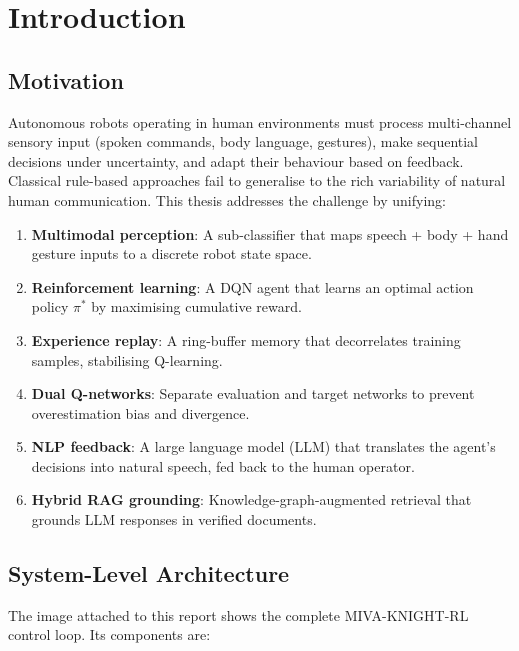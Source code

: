 \documentclass[12pt,a4paper]{article}
\theoremstyle{definition}
\theoremstyle{plain}
\theoremstyle{remark}
\begin{document}
\section{Introduction}

\subsection{Motivation}

Autonomous robots operating in human environments must process multi-channel sensory input (spoken commands, body language, gestures), make sequential decisions under uncertainty, and adapt their behaviour based on feedback. Classical rule-based approaches fail to generalise to the rich variability of natural human communication. This thesis addresses the challenge by unifying:

\begin{enumerate}
  \item \textbf{Multimodal perception}: A sub-classifier that maps speech + body + hand gesture inputs to a discrete robot state space.
  \item \textbf{Reinforcement learning}: A DQN agent that learns an optimal action policy $\pi^*$ by maximising cumulative reward.
  \item \textbf{Experience replay}: A ring-buffer memory that decorrelates training samples, stabilising Q-learning.
  \item \textbf{Dual Q-networks}: Separate evaluation and target networks to prevent overestimation bias and divergence.
  \item \textbf{NLP feedback}: A large language model (LLM) that translates the agent's decisions into natural speech, fed back to the human operator.
  \item \textbf{Hybrid RAG grounding}: Knowledge-graph-augmented retrieval that grounds LLM responses in verified documents.
\end{enumerate}

\subsection{System-Level Architecture}

The image attached to this report shows the complete MIVA-KNIGHT-RL control loop. Its components are:
\end{document}
